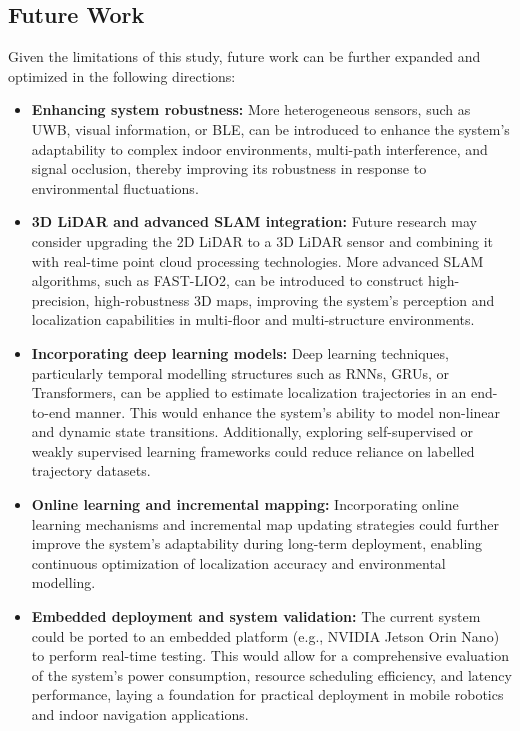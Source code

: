\documentclass[12pt,a4paper]{article}
\numberwithin{equation}{section}
\begin{document}
\subsection{Future Work}
Given the limitations of this study, future work can be further expanded and
optimized in the following directions:

\begin{itemize}
\item \textbf{Enhancing system robustness:} More heterogeneous sensors, such as
  UWB, visual information, or BLE, can be introduced to enhance the system's
  adaptability to complex indoor environments, multi-path interference, and
  signal occlusion, thereby improving its robustness in response to
  environmental fluctuations.
    
\item \textbf{3D LiDAR and advanced SLAM integration:} Future research may
  consider upgrading the 2D LiDAR to a 3D LiDAR sensor and combining it with
  real-time point cloud processing technologies. More advanced SLAM algorithms,
  such as FAST-LIO2, can be introduced to construct high-precision,
  high-robustness 3D maps, improving the system's perception and localization
  capabilities in multi-floor and multi-structure environments.
    
\item \textbf{Incorporating deep learning models:} Deep learning techniques,
  particularly temporal modelling structures such as RNNs, GRUs, or
  Transformers, can be applied to estimate localization trajectories in an
  end-to-end manner. This would enhance the system's ability to model non-linear
  and dynamic state transitions. Additionally, exploring self-supervised or
  weakly supervised learning frameworks could reduce reliance on labelled
  trajectory datasets.
    
\item \textbf{Online learning and incremental mapping:} Incorporating online
  learning mechanisms and incremental map updating strategies could further
  improve the system's adaptability during long-term deployment, enabling
  continuous optimization of localization accuracy and environmental modelling.
    
\item \textbf{Embedded deployment and system validation:} The current system
  could be ported to an embedded platform (e.g., NVIDIA Jetson Orin Nano) to
  perform real-time testing. This would allow for a comprehensive evaluation of
  the system's power consumption, resource scheduling efficiency, and latency
  performance, laying a foundation for practical deployment in mobile robotics
  and indoor navigation applications.
\end{itemize}
\end{document}
